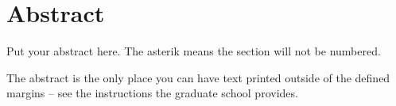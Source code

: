 
\section*{Abstract}

\noindent
Put your abstract here.  The asterik means the section will not
be numbered.

The abstract is the only place you can have text 
printed outside of the defined margins -- see the instructions
the graduate school provides.
